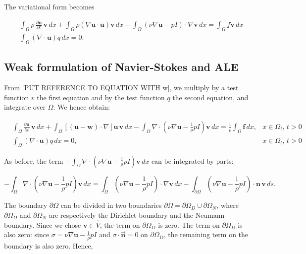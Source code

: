 \documentclass[11pt,a4paper,titlepage]{report}
\begin{document}
The variational form becomes

\begin{align}
& \int_{\Omega} \rho \, \frac{\partial \mathbf{u}}{\partial t} \, \mathbf{v} \, dx + \int_{\Omega} \rho (\nabla \mathbf{u} \cdot \mathbf{u})\mathbf{v} \, dx - \int_{\Omega} (\nu \nabla \mathbf{u} - pI) \cdot \nabla \mathbf{v} \, dx = \int_{\Omega} f\mathbf{v} \, dx \\
& \int_{\Omega} (\nabla \cdot \mathbf{u}) q \, dx = 0.
\end{align}


\subsection{Weak formulation of Navier-Stokes and ALE}


From [PUT REFERENCE TO EQUATION WITH w], we multiply by a test function $v$ the first equation and by the test function $q$ the second equation, and integrate over $\Omega$. We hence obtain:


\[
\begin{aligned}
& \int_{\Omega} \frac{\partial \mathbf{u}}{\partial t} \, \mathbf{v} \, dx
+ \int_{\Omega} [(\mathbf{u - w}) \cdot \nabla] \mathbf{u} \, \mathbf{v} \, dx
- \int_{\Omega} \nabla \cdot (\nu \nabla \mathbf{u} -  \frac{1}{\rho}  pI)\mathbf{v} \, dx
=  \frac{1}{\rho} \int_{\Omega} \mathbf{f} \, dx,  & x \in \Omega_t, \, t>0 \\
& \int_{\Omega}  (\nabla \cdot \mathbf{u}) q \, dx = 0 , & x \in \Omega_t, \, t>0
\end{aligned}
\]


As before, the term $- \int_{\Omega} \nabla \cdot (\nu \nabla \mathbf{u} -   \frac{1}{\rho}  pI)\mathbf{v} \, dx$ can be integrated by parts:

\[
- \int_{\Omega} \nabla \cdot (\nu \nabla \mathbf{u} -  \frac{1}{\rho} pI)\mathbf{v} \, dx =  \int_{\Omega} (\nu \nabla \mathbf{u} -  \frac{1}{\rho}  pI) \cdot \nabla \mathbf{v} \, dx - \int_{\partial \Omega} (\nu \nabla \mathbf{u} -  \frac{1}{\rho}  pI) \cdot \mathbf{n} \, \mathbf{v} \, ds.
\]

The boundary $\partial \Omega$ can be divided in two boundaries $ \partial \Omega = \partial \Omega_D \cup \partial \Omega_N $, where $\partial \Omega_D$ and $\partial \Omega_N$ are respectively the Dirichlet boundary and the Neumann boundary.
Since we chose $\mathbf{v} \in \hat{V}$, the term on $\partial \Omega_{D}$ is zero. The term on $\partial \Omega_{D}$ is also zero: since $\sigma = \nu \nabla \mathbf{u} -  \frac{1}{\rho} pI$ and $\sigma \cdot \vec{\mathbf{n}} = 0$ on $\partial \Omega_{D}$, the remaining term on the boundary is also zero. Hence,
\end{document}
